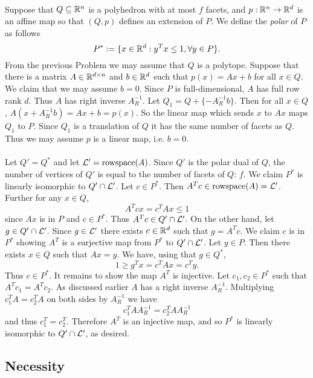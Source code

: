 \documentclass[letterpaper,12pt,oneside,onecolumn]{article}
\begin{document}
\paragraph{}
Suppose that $Q\subseteq \mathbb{R}^n$ is a polyhedron with at most $f$ facets, and $p:\mathbb{R}^n \rightarrow \mathbb{R}^d$ is an affine map so that $(Q,p)$ defines an extension of $P$. We define the \emph{polar} of $P$ as follows
$$P^* := \{x \in \mathbb{R}^d : y^Tx \leq 1, \forall y \in P\}.$$
From the previous Problem we may assume that $Q$ is a polytope. Suppose that there is a matrix $A \in \mathbb{R}^{d\times n}$ and $b \in \mathbb{R}^d$ such that $p(x) = Ax + b$ for all $x \in Q$. We claim that we may assume $b = 0$. Since $P$ is full-dimensional, $A$ has full row rank $d$. Thus $A$ has right inverse $A^{-1}_R$. Let $Q_1 = Q + \{-A^{-1}_Rb\}$. Then for all $x \in Q$,
$A(x + A^{-1}_Rb) = Ax  + b  = p(x).$ So the linear map which sends $x$ to $Ax$ maps $Q_1$ to $P$. Since $Q_1$ is a translation of $Q$ it has the same number of facets as $Q$. Thus we may assume $p$ is a linear map, i.e. $b=0$.
\paragraph{}
Let $Q' = Q^*$ and let $\mathcal{L}' = \text{rowspace}(A)$. Since $Q'$ is the polar dual of $Q$, the number of vertices of $Q'$ is equal to the number of facets of $Q$: $f$. We claim $P^*$ is linearly isomorphic to $Q' \cap \mathcal{L}'$. Let $c \in P^*$. Then $A^Tc \in \text{rowspace}(A) = \mathcal{L}'$. Further for any $x \in Q$,
$$ A^Tcx = c^TAx \leq 1$$
since $Ax$ is in $P$ and $c \in P^*$. Thus $A^Tc \in Q' \cap \mathcal{L}'$. On the other hand, let $g \in Q' \cap \mathcal{L}'$. Since $g \in \mathcal{L}'$ there exists $c \in \mathbb{R}^d$ such that $g = A^Tc$. We claim $c$ is in $P^*$ showing $A^T$ is a surjective map from $P^*$ to $Q' \cap \mathcal{L}'$. Let $y \in P$. Then there exists $x \in Q$ such that $Ax = y$. We have, using that $g \in Q^*$, 
$$1 \geq g^T x = c^TAx = c^Ty.$$
Thus $c \in P^*$. It remains to show the map $A^T$ is injective. Let $c_1,c_2 \in P^*$ such that $A^Tc_1 = A^Tc_2.$ As discussed earlier $A$ has a right inverse $A^{-1}_R$. Multiplying $c_1^T A = c_2^T A$ on both sides by $A^{-1}_R$ we have
$$c_1^TAA^{-1}_R = c_2^TAA^{-1}_R$$
and thus $c_1^T = c_2^T$. Therefore $A^T$ is an injective map, and so $P^*$ is linearly isomorphic to $Q' \cap \mathcal{L}'$, as desired.
\subsection*{Necessity}
\end{document}
